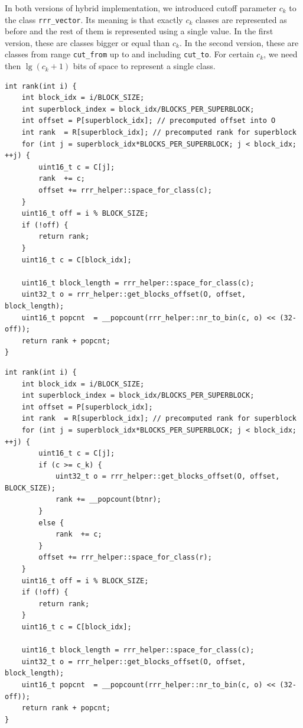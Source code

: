 In both versions of hybrid implementation, we introduced cutoff parameter $c_k$ to the
class \verb'rrr_vector'. Its meaning is that exactly $c_k$ classes are represented
as before and the rest of them is represented using a single value. In the first version,
these are classes bigger or equal than $c_k$. In the second version, these are classes
from range \texttt{cut\_from} up to and including \texttt{cut\_to}. For certain $c_k$,
we need then $\lg (c_k+1)$ bits of space to represent a single class.

\begin{lstlisting}
int rank(int i) {
	int block_idx = i/BLOCK_SIZE;
	int superblock_index = block_idx/BLOCKS_PER_SUPERBLOCK;
	int offset = P[superblock_idx]; // precomputed offset into O
	int rank  = R[superblock_idx]; // precomputed rank for superblock
	for (int j = superblock_idx*BLOCKS_PER_SUPERBLOCK; j < block_idx; ++j) {
		uint16_t c = C[j];
		rank  += c;
		offset += rrr_helper::space_for_class(c);
	}
	uint16_t off = i % BLOCK_SIZE;
	if (!off) {
		return rank;
	}
	uint16_t c = C[block_idx];

	uint16_t block_length = rrr_helper::space_for_class(c);
	uint32_t o = rrr_helper::get_blocks_offset(O, offset, block_length);
	uint16_t popcnt  = __popcount(rrr_helper::nr_to_bin(c, o) << (32-off));
	return rank + popcnt;
}
\end{lstlisting}

\begin{lstlisting}
int rank(int i) {
	int block_idx = i/BLOCK_SIZE;
	int superblock_index = block_idx/BLOCKS_PER_SUPERBLOCK;
	int offset = P[superblock_idx];
	int rank  = R[superblock_idx]; // precomputed rank for superblock
	for (int j = superblock_idx*BLOCKS_PER_SUPERBLOCK; j < block_idx; ++j) {
		uint16_t c = C[j];
		if (c >= c_k) {
			uint32_t o = rrr_helper::get_blocks_offset(O, offset, BLOCK_SIZE);
			rank += __popcount(btnr);
		}
		else {
			rank  += c;
		}
		offset += rrr_helper::space_for_class(r);
	}
	uint16_t off = i % BLOCK_SIZE;
	if (!off) {
		return rank;
	}
	uint16_t c = C[block_idx];

	uint16_t block_length = rrr_helper::space_for_class(c);
	uint32_t o = rrr_helper::get_blocks_offset(O, offset, block_length);
	uint16_t popcnt  = __popcount(rrr_helper::nr_to_bin(c, o) << (32-off));
	return rank + popcnt;
}
\end{lstlisting}

